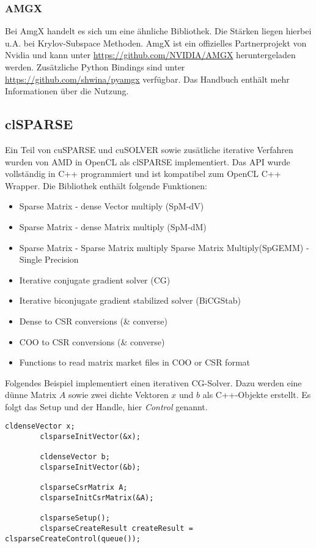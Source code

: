 			\subsubsection{AMGX}	
			Bei AmgX handelt es sich um eine ähnliche Bibliothek. Die Stärken liegen hierbei u.A. bei Krylov-Subspace Methoden. AmgX ist ein offizielles Partnerprojekt von Nvidia und kann unter \url{https://github.com/NVIDIA/AMGX} heruntergeladen werden. Zusätzliche Python Bindings sind unter \url{https://github.com/shwina/pyamgx} verfügbar. Das Handbuch enthält mehr Informationen über die Nutzung. \autocite{amgx}	
			
		\subsection{clSPARSE}
		Ein Teil von cuSPARSE und cuSOLVER sowie zusätliche iterative Verfahren wurden von AMD in OpenCL als clSPARSE implementiert. Das \Gls{API} wurde vollständig in C++ programmiert und ist kompatibel zum OpenCL C++ Wrapper. Die Bibliothek enthält folgende Funktionen:
		
		\newpage
		
		\begin{itemize}				
			\item Sparse Matrix - dense Vector multiply (SpM-dV)
			\item Sparse Matrix - dense Matrix multiply (SpM-dM)
			\item Sparse Matrix - Sparse Matrix multiply Sparse Matrix Multiply(SpGEMM) - Single Precision
			\item Iterative conjugate gradient solver (CG)
			\item Iterative biconjugate gradient stabilized solver (BiCGStab)
			\item Dense to CSR conversions (\& converse)
			\item COO to CSR conversions (\& converse)
			\item Functions to read matrix market files in COO or CSR format
    	\end{itemize}
    	
    	Folgendes Beispiel implementiert einen iterativen CG-Solver. Dazu werden eine dünne Matrix $A$ sowie zwei dichte Vektoren $x$ und $b$ als C++-Objekte erstellt. Es folgt das Setup und der \Gls{Handle}, hier \textit{Control} genannt. 
    	\begin{lstlisting}[caption=clSPARSE: Initialisieren]
		cldenseVector x;
		clsparseInitVector(&x);
		
		cldenseVector b;
		clsparseInitVector(&b); 

		clsparseCsrMatrix A;
		clsparseInitCsrMatrix(&A); 
    	
		clsparseSetup();
		clsparseCreateResult createResult = clsparseCreateControl(queue());
    	\end{lstlisting}


